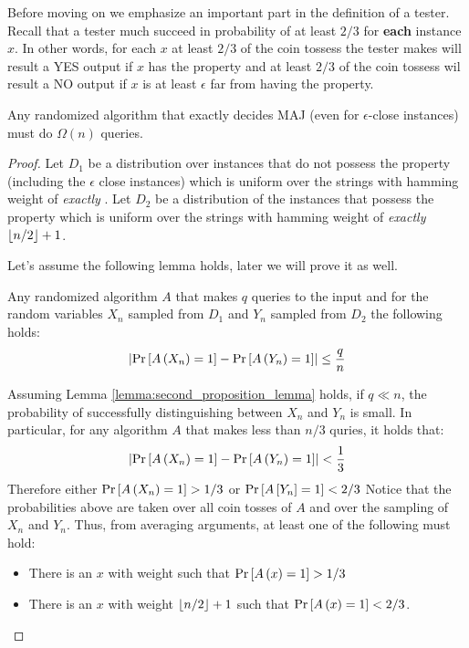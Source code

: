 Before moving on we emphasize an important part in the definition of a tester. 
Recall that a tester much succeed in probability of at least \(2/3\) for \textbf{each} instance \(x\).
In other words, for each \(x\) at least \(2/3\) of the coin tossess the tester makes will result a YES output if \(x\) has the property and at least \(2/3\) of the coin tossess wil result a NO output if \(x\) is at least \(\epsilon\) far from having the property.

\begin{proposition}
    Any randomized algorithm that exactly decides MAJ (even for \(\epsilon\)-close instances) must do \(\Omega(n)\) queries.
\end{proposition}

\begin{proof}
    Let \(D_1\) be a distribution over instances that do not possess the property (including the \(\epsilon\) close instances) which is uniform over the strings with hamming weight of \emph{exactly} .
    Let \(D_2\) be a distribution of the instances that  possess the property which is uniform over the strings with hamming weight of \emph{exactly} \(\lfloor n/2\rfloor + 1\).

    Let's assume the following lemma holds, later we will prove it as well.
    \begin{lemma}\label{lemma:second_proposition_lemma}
    Any randomized algorithm \(A\) that makes \(q\) queries to the input and for the random variables \(X_n\) sampled from \(D_1\) and \(Y_n\) sampled from \(D_2\) the following holds:
    \[
    \left|\text{Pr}\left[A\left(X_n\right) = 1\right] - \text{Pr}\left[A\left(Y_n\right) = 1\right]\right| \leq \frac{q}{n}
    \]
    \end{lemma}

    Assuming Lemma \ref{lemma:second_proposition_lemma} holds, if \(q \ll n\), the probability of successfully distinguishing between \(X_n\) and \(Y_n\) is small.
    In particular, for any algorithm \(A\) that makes less than \(n/3\) quries, it holds that:
    \[
        \left|\text{Pr}\left[A\left(X_n\right) = 1\right] - \text{Pr}\left[A\left(Y_n\right) = 1\right]\right| < \frac{1}{3}
    \]
    Therefore either \(\text{Pr}\left[A\left(X_n\right) = 1\right] > 1/3\) or \(\text{Pr}\left[A\left[Y_n\right] = 1\right] < 2/3\)
    Notice that the probabilities above are taken over all coin tosses of \(A\) and over the sampling of \(X_n\) and \(Y_n\). Thus, from averaging arguments, at least one of the following must hold:
    \begin{itemize}
        \item There is an \(x\) with weight  such that \(\text{Pr}\left[A\left(x\right) = 1\right] > 1/3\)
        \item There is an \(x\) with weight \(\lfloor n/2\rfloor + 1\) such that \(\text{Pr}\left[A\left(x\right) = 1\right] < 2/3\).
    \end{itemize} 

\end{proof}

